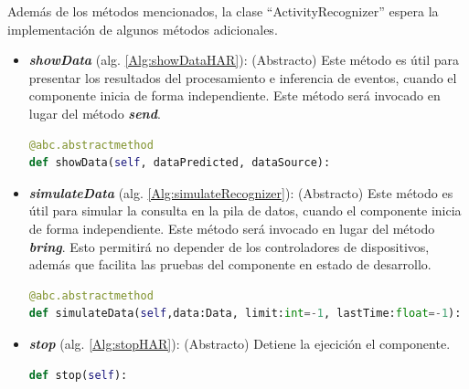         Además de los métodos mencionados, la clase ``ActivityRecognizer'' espera la implementación de algunos métodos adicionales.
        
        \begin{itemize}
            
            \item \textbf{\textit{showData}} (alg. \ref{Alg:showDataHAR}):
            (Abstracto) Este método es útil para presentar los resultados del procesamiento e inferencia de eventos, cuando el componente inicia de forma independiente. Este método será invocado en lugar del método \textbf{\textit{send}}.
            \begin{lstlisting}[language=Python, caption={Firma del método ``\textit{showData}'' de la clase ActivityRecognizer.}, label=Alg:showDataHAR, numbers=none]
@abc.abstractmethod
def showData(self, dataPredicted, dataSource):
            \end{lstlisting}
            
            \item \textbf{\textit{simulateData}} (alg. \ref{Alg:simulateRecognizer}):
            (Abstracto) Este método es útil para simular la consulta en la pila de datos, cuando el componente inicia de forma independiente. Este método será invocado en lugar del método \textbf{\textit{bring}}. Esto permitirá no depender de los controladores de dispositivos, además que facilita las pruebas del componente en estado de desarrollo.
            \begin{lstlisting}[language=Python, caption={Firma del método ``\textit{simulateData}''.}, label=Alg:simulateRecognizer, numbers=none]
@abc.abstractmethod
def simulateData(self,data:Data, limit:int=-1, lastTime:float=-1):
            \end{lstlisting}
            
            \item \textbf{\textit{stop}} (alg. \ref{Alg:stopHAR}):
            (Abstracto) Detiene la ejecición el componente. 
            \begin{lstlisting}[language=Python, caption={Firma del método ``\textit{stop}''.}, label=Alg:stopHAR, numbers=none]
def stop(self):
            \end{lstlisting}
            
        \end{itemize}
    
